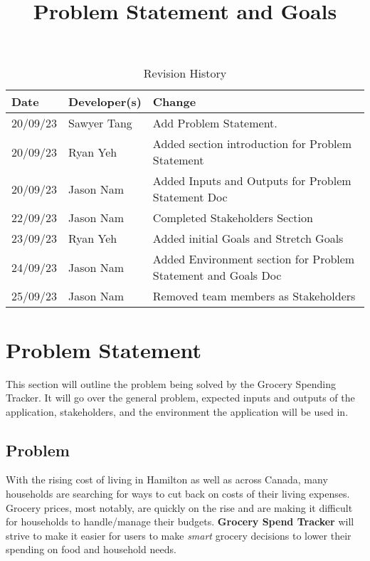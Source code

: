 \documentclass{article}
\title{Problem Statement and Goals\\\progname}
\author{\authname}
\date{}
\begin{document}
\maketitle

\begin{table}[hp]
\caption{Revision History} \label{TblRevisionHistory}
\begin{tabularx}{\textwidth}{llX}
\toprule
\textbf{Date} & \textbf{Developer(s)} & \textbf{Change}\\
\midrule
20/09/23 & Sawyer Tang & Add Problem Statement.\\
20/09/23 & Ryan Yeh & Added section introduction for Problem Statement\\
20/09/23 & Jason Nam & Added Inputs and Outputs for Problem Statement Doc\\
22/09/23 & Jason Nam & Completed Stakeholders Section\\
23/09/23 & Ryan Yeh & Added initial Goals and Stretch Goals\\
24/09/23 & Jason Nam & Added Environment section for Problem Statement and Goals Doc\\
25/09/23 & Jason Nam & Removed team members as Stakeholders\\
\bottomrule
\end{tabularx}
\end{table}

\section{Problem Statement}


This section will outline the problem being solved by the Grocery Spending Tracker. It will go
over the general problem, expected inputs and outputs of the application, stakeholders, and the environment
the application will be used in.

\subsection{Problem}

With the rising cost of living in Hamilton as well as across Canada, many households are searching for ways to cut back on costs of their living expenses. Grocery prices, most notably, are quickly on the rise and are making it difficult for households to handle/manage their budgets. \textbf{Grocery Spend Tracker} will strive to make it easier for users to make \textit{smart} grocery decisions to lower their spending on food and household needs.
\end{document}
